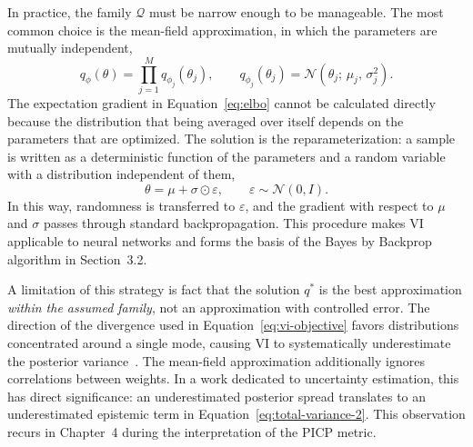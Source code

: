 In practice, the family $\mathcal{Q}$ must be narrow enough to be manageable. The
most common choice is the mean-field approximation, in which the parameters are mutually
independent,
%
\begin{equation}
    q_\phi(\theta) = \prod_{j=1}^{M} q_{\phi_j}(\theta_j),
    \qquad
    q_{\phi_j}(\theta_j) = \mathcal{N}(\theta_j;\, \mu_j,\, \sigma_j^2) .
    \label{eq:mean-field}
\end{equation}
%
The expectation gradient in Equation~\eqref{eq:elbo} cannot be calculated directly
because the distribution that being averaged over itself depends on the parameters that
are optimized. The solution is the reparameterization: a sample is written as a
deterministic function of the parameters and a random variable with a distribution
independent of them,
%
\begin{equation}
    \theta = \mu + \sigma \odot \varepsilon,
    \qquad \varepsilon \sim \mathcal{N}(0, I) .
    \label{eq:reparameterization}
\end{equation}
%
In this way, randomness is transferred to $\varepsilon$, and the gradient with respect to
$\mu$ and $\sigma$ passes through standard backpropagation. This procedure makes VI
applicable to neural networks and forms the basis of the Bayes by Backprop algorithm in
Section~3.2.

A limitation of this strategy is fact that the solution $q^\ast$ is the best
approximation \emph{within the assumed family}, not an approximation with controlled error.
The direction of the divergence used in Equation~\eqref{eq:vi-objective} favors
distributions concentrated around a single mode, causing VI to systematically underestimate
the posterior variance~\cite{blei2017}. The mean-field approximation additionally ignores
correlations between weights. In a work dedicated to uncertainty estimation, this has direct
significance: an underestimated posterior spread translates to an underestimated epistemic
term in Equation~\eqref{eq:total-variance-2}. This observation recurs in Chapter~4 during the
interpretation of the PICP metric.